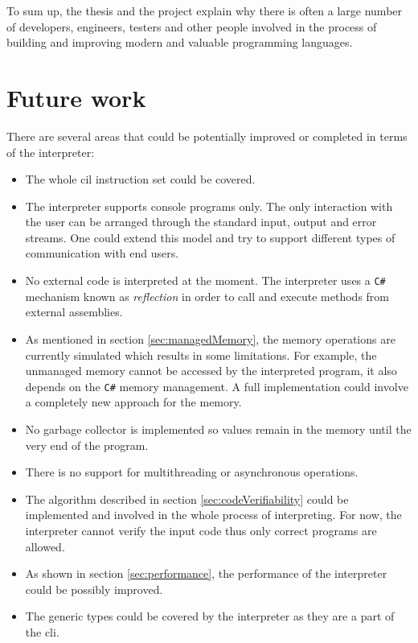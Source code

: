 \documentclass[declaration,shortabstract,english,mgr]{iithesis}
\begin{document}
To sum up, the thesis and the project explain why there is often a large number of developers, engineers, testers and other people involved in the process of building and improving modern and valuable programming languages.

\section{Future work}
\label{sec:future_work}

There are several areas that could be potentially improved or completed in terms of the interpreter:
\begin{itemize}
	\item{The whole \acrshort{cil} instruction set could be covered.}
	\item{The interpreter supports console programs only. The only interaction with the user can be arranged through the standard input, output and error streams. One could extend this model and try to support different types of communication with end users.}
	\item{No external code is interpreted at the moment. The interpreter uses a \texttt{C\#} mechanism known as \textit{reflection} in order to call and execute methods from external assemblies.}
	\item{As mentioned in section \ref{sec:managedMemory}, the memory operations are currently simulated which results in some limitations. For example, the unmanaged memory cannot be accessed by the interpreted program, it also depends on the \texttt{C\#} memory management. A full implementation could involve a completely new approach for the memory.}
	\item{No garbage collector is implemented so values remain in the memory until the very end of the program.}
	\item{There is no support for multithreading or asynchronous operations.}
	\item{The algorithm described in section \ref{sec:codeVerifiability} could be implemented and involved in the whole process of interpreting. For now, the interpreter cannot verify the input code thus only correct programs are allowed.}
	\item{As shown in section \ref{sec:performance}, the performance of the interpreter could be possibly improved.}
	\item{The generic types could be covered by the interpreter as they are a part of the \acrshort{cli}.}
\end{itemize}
\end{document}
